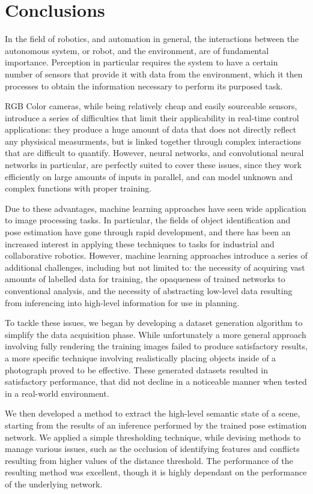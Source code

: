 \chapter{Conclusions}

In the field of robotics, and automation in general, the interactions between the autonomous system, or robot, and the environment, are of fundamental importance. Perception in particular requires the system to have a certain number of sensors that provide it with data from the environment, which it then processes to obtain the information necessary to perform its purposed task.

RGB Color cameras, while being relatively cheap and easily sourceable sensors, introduce a series of difficulties that limit their applicability in real-time control applications: they produce a huge amount of data that does not directly reflect any physisical measurments, but is linked together through complex interactions that are difficult to quantify. However, neural networks, and convolutional neural networks in particular, are perfectly suited to cover these issues, since they work efficiently on large amounts of inputs in parallel, and can model unknown and complex functions with proper training.

Due to these advantages, machine learning approaches have seen wide application to image processing tasks. In particular, the fields of object identification and pose estimation have gone through rapid development, and there has been an increased interest in applying these techniques to tasks for industrial and collaborative robotics. However, machine learning approaches introduce a series of additional challenges, including but not limited to: the necessity of acquiring vast amounts of labelled data for training, the opaqueness of trained networks to conventional analysis, and the necessity of abstracting low-level data resulting from inferencing into high-level information for use in planning.

To tackle these issues, we began by developing a dataset generation algorithm to simplify the data acquisition phase. While unfortunately a more general approach involving fully rendering the training images failed to produce satisfactory results, a more specific technique involving realistically placing objects inside of a photograph proved to be effective. These generated datasets resulted in satisfactory performance, that did not decline in a noticeable manner when tested in a real-world environment.

We then developed a method to extract the high-level semantic state of a scene, starting from the results of an inference performed by the trained pose estimation network. We applied a simple thresholding technique, while devising methods to manage various issues, such as the occlusion of identifying features and conflicts resulting from higher values of the distance threshold. The performance of the resulting method was excellent, though it is highly dependant on the performance of the underlying network.

